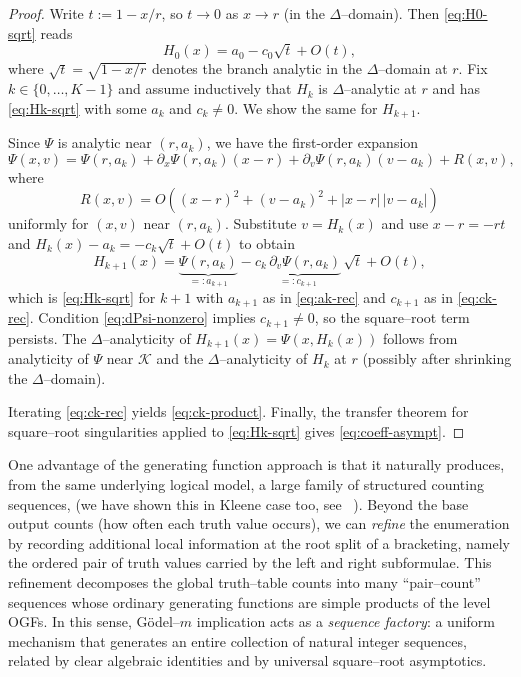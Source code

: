 \documentclass[11pt]{article}
\begin{document}
\begin{proof}
Write $t:=1-x/r$, so $t\to 0$ as $x\to r$ (in the $\Delta$--domain). Then \eqref{eq:H0-sqrt} reads
\[
H_0(x)=a_0-c_0\sqrt{t}+O(t),
\]
where $\sqrt{t}=\sqrt{1-x/r}$ denotes the branch analytic in the $\Delta$--domain at $r$.
Fix $k\in\{0,\dots,K-1\}$ and assume inductively that $H_k$ is $\Delta$--analytic at $r$ and has
\eqref{eq:Hk-sqrt} with some $a_k$ and $c_k\neq 0$. We show the same for $H_{k+1}$.

Since $\Psi$ is analytic near $(r,a_k)$, we have the first-order expansion
\[
\Psi(x,v)=\Psi(r,a_k)+\partial_x\Psi(r,a_k)(x-r)+\partial_v\Psi(r,a_k)(v-a_k)+R(x,v),
\]
where
\[
R(x,v)=O\!\left((x-r)^2+(v-a_k)^2+|x-r|\,|v-a_k|\right)
\]
uniformly for $(x,v)$ near $(r,a_k)$.
Substitute $v=H_k(x)$ and use $x-r=-rt$ and $H_k(x)-a_k=-c_k\sqrt{t}+O(t)$ to obtain
\[
H_{k+1}(x)=\underbrace{\Psi(r,a_k)}_{=:a_{k+1}}
-\underbrace{c_k\,\partial_v\Psi(r,a_k)}_{=:c_{k+1}}\,\sqrt{t}+O(t),
\]
which is \eqref{eq:Hk-sqrt} for $k+1$ with $a_{k+1}$ as in \eqref{eq:ak-rec} and $c_{k+1}$ as in
\eqref{eq:ck-rec}. Condition \eqref{eq:dPsi-nonzero} implies $c_{k+1}\neq 0$, so the square--root term
persists. The $\Delta$--analyticity of $H_{k+1}(x)=\Psi(x,H_k(x))$ follows from analyticity of $\Psi$
near $\mathcal{K}$ and the $\Delta$--analyticity of $H_k$ at $r$ (possibly after shrinking the
$\Delta$--domain).

Iterating \eqref{eq:ck-rec} yields \eqref{eq:ck-product}. Finally, the transfer theorem for square--root
singularities applied to \eqref{eq:Hk-sqrt} gives \eqref{eq:coeff-asympt}.
\end{proof}





One advantage of the generating function approach is that it naturally produces, from the same underlying logical model, a large family of structured counting sequences, (we have shown this in Kleene case too, see ~\cite{Yildiz2020}).  Beyond the base output counts (how often each truth value occurs), we can \emph{refine} the enumeration by recording additional local information at the root split of a bracketing, namely the ordered pair of truth values carried by the left and right subformulae.  This refinement decomposes the global truth--table counts into many ``pair--count'' sequences whose ordinary generating functions are simple products of the level OGFs.  In this sense, Gödel--$m$ implication acts as a \emph{sequence factory}: a uniform mechanism that generates an entire collection of natural integer sequences, related by clear algebraic identities and by universal square--root asymptotics.
\end{document}
